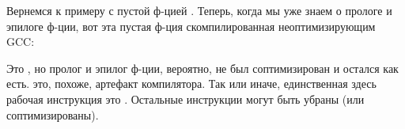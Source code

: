 
Вернемся к примеру с пустой ф-цией .
Теперь, когда мы уже знаем о прологе и эпилоге ф-ции,
вот эта пустая ф-ция  скомпилированная неоптимизирующим GCC:



Это , но пролог и эпилог ф-ции, вероятно, не был соптимизирован и остался как есть.
 это, похоже, артефакт компилятора.
Так или иначе, единственная здесь рабочая инструкция это .
Остальные инструкции могут быть убраны (или соптимизированы).


